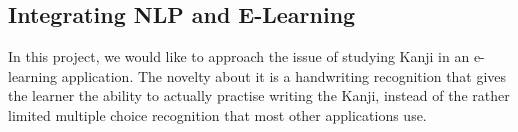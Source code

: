 
\subsection{Integrating NLP and E-Learning}
In this project, we would like to approach the issue of studying Kanji in an 
e-learning application. The novelty about it is a handwriting recognition that 
gives the learner the ability to actually practise writing the Kanji, instead 
of the rather limited multiple choice recognition that most other applications 
use.


